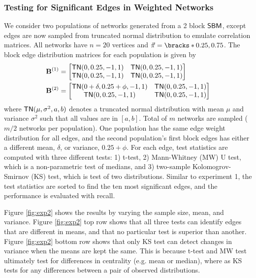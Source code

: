 \subsubsection{Testing for Significant Edges in Weighted Networks} \label{sec:exp2}
We consider two populations of networks generated from a 2 block $\operatorname{\mathsf{SBM}}$, except edges are now sampled from truncated normal distribution to emulate correlation matrices. All networks have $n=20$ vertices and $\vec{\pi} = \bracks*{0.25, 0.75}$. The block edge distribution matrices for each population is given by
\begin{align*}
    \operatorname{\mathbf{B}}^{(1)} &= 
    \begin{bmatrix}
        \operatorname{\mathsf{TN}}(0, 0.25, -1, 1)   & \operatorname{\mathsf{TN}}(0, 0.25, -1, 1) \\
        \operatorname{\mathsf{TN}}(0, 0.25, -1, 1)   & \operatorname{\mathsf{TN}}(0, 0.25, -1, 1) 
    \end{bmatrix} \\
    \operatorname{\mathbf{B}}^{(2)} &= 
    \begin{bmatrix}
        \operatorname{\mathsf{TN}}(0 + \delta, 0.25 + \phi, -1, 1)   & \operatorname{\mathsf{TN}}(0, 0.25, -1, 1) \\
        \operatorname{\mathsf{TN}}(0, 0.25, -1, 1)   & \operatorname{\mathsf{TN}}(0, 0.25, -1, 1) 
    \end{bmatrix}
\end{align*}
where $\operatorname{\mathsf{TN}}(\mu, \sigma^2, a, b)$ denotes a truncated normal distribution with mean $\mu$ and variance $\sigma^2$ such that all values are in $[a, b]$. Total of $m$ networks are sampled ($m/2$ networks per population). One population has the same edge weight distribution for all edges, and the second population's first block edges has either a different mean, $\delta$, or variance, $0.25 + \phi$.
For each edge, test statistics are computed with three different tests: 1) t-test, 2) Mann-Whitney (MW) U test, which is a non-parametric test of medians, and 3) two-sample Kolomogrov-Smirnov (KS) test, which is test of two distributions. Similar to experiment 1, the test statistics are sorted to find the ten most significant edges, and the performance is evaluated with recall.

Figure \ref{fig:exp2} shows the results by varying the sample size, mean, and variance. Figure \ref{fig:exp2} top row shows that all three tests can identify edges that are different in means, and that no particular test is superior than another. 
Figure \ref{fig:exp2} bottom row shows that only KS test can detect changes in variance when the means are kept the same. This is because t-test and MW test ultimately test for differences in centrality (e.g. mean or median), where as KS tests for any differences between a pair of observed distributions. 

